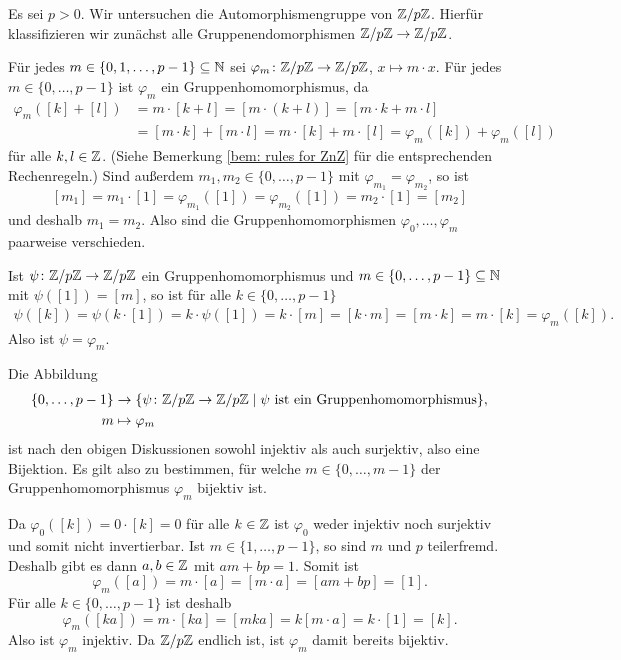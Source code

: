 \begin{bsp}
 Es sei $p > 0$. Wir untersuchen die Automorphismengruppe von $\mathbb{Z}/p\mathbb{Z}$. Hierfür klassifizieren wir zunächst alle Gruppenendomorphismen $\mathbb{Z}/p\mathbb{Z} \to \mathbb{Z}/p\mathbb{Z}$.
   
 Für jedes $m \in \{0, 1, \dotsc, p-1\} \subseteq \mathbb{N}$ sei $\varphi_m \colon \mathbb{Z}/p\mathbb{Z} \to \mathbb{Z}/p\mathbb{Z}$, $x \mapsto m \cdot x$. Für jedes $m \in \{0, \dotsc, p-1\}$ ist $\varphi_m$ ein Gruppenhomomorphismus, da
 \begin{align*}
  \varphi_m([k] + [l])
  &= m \cdot [k+l]
  = [m \cdot (k+l)]
  = [m \cdot k + m \cdot l] \\
  &= [m \cdot k] + [m \cdot l]
  = m \cdot [k] + m \cdot [l]
  = \varphi_m([k]) + \varphi_m([l])
 \end{align*}
 für alle $k,l \in \mathbb{Z}$. (Siehe Bemerkung \ref{bem: rules for ZnZ} für die entsprechenden Rechenregeln.) Sind außerdem $m_1, m_2 \in \{0, \dotsc, p-1\}$ mit $\varphi_{m_1} = \varphi_{m_2}$, so ist
 \[
  [m_1]
  = m_1 \cdot [1]
  = \varphi_{m_1}([1])
  = \varphi_{m_2}([1])
  = m_2 \cdot [1]
  = [m_2]
 \]
 und deshalb $m_1 = m_2$. Also sind die Gruppenhomomorphismen $\varphi_0, \dotsc, \varphi_m$ paarweise verschieden.
 
 Ist $\psi \colon \mathbb{Z}/p\mathbb{Z} \to \mathbb{Z}/p\mathbb{Z}$ ein Gruppenhomomorphismus und \mbox{$m \in \{0, \dotsc, p-1\} \subseteq \mathbb{N}$} mit $\psi([1]) = [m]$, so ist für alle $k \in \{0, \dotsc, p-1\}$
 \begin{align*}
  \psi([k])
  = \psi(k \cdot [1])
  = k \cdot \psi([1])
  = k \cdot [m]
  = [k \cdot m]
  = [m \cdot k]
  = m \cdot [k]
  = \varphi_m([k]).
 \end{align*}
 Also ist $\psi = \varphi_m$.
 
 Die Abbildung
 \begin{align*}
  \{0, \dotsc, p-1\}
  &\to
  \{\psi \colon \mathbb{Z}/p\mathbb{Z} \to \mathbb{Z}/p\mathbb{Z} \mid \text{$\psi$ ist ein Gruppenhomomorphismus}\}, \\
  m &\mapsto \varphi_m
 \end{align*}
 ist nach den obigen Diskussionen sowohl injektiv als auch surjektiv, also eine Bijektion. Es gilt also zu bestimmen, für welche $m \in \{0, \dotsc, m-1\}$ der Gruppenhomomorphismus $\varphi_m$ bijektiv ist.
 
 Da $\varphi_0([k]) = 0 \cdot [k] = 0$ für alle $k \in \mathbb{Z}$ ist $\varphi_0$ weder injektiv noch surjektiv und somit nicht invertierbar. Ist $m \in \{1, \dotsc, p-1\}$, so sind $m$ und $p$ teilerfremd. Deshalb gibt es dann $a,b \in \mathbb{Z}$ mit $a m + b p = 1$. Somit ist
 \[
  \varphi_m([a])
  = m \cdot [a]
  = [m \cdot a]
  = [a m + b p]
  = [1].
 \]
 Für alle $k \in \{0, \dotsc, p-1\}$ ist deshalb
 \[
  \varphi_m([ka])
  = m \cdot [ka]
  = [m k a]
  = k [m \cdot a]
  = k \cdot [1]
  = [k].
 \]
 Also ist $\varphi_m$ injektiv. Da $\mathbb{Z}/p\mathbb{Z}$ endlich ist, ist $\varphi_m$ damit bereits bijektiv.
 

\end{bsp}
